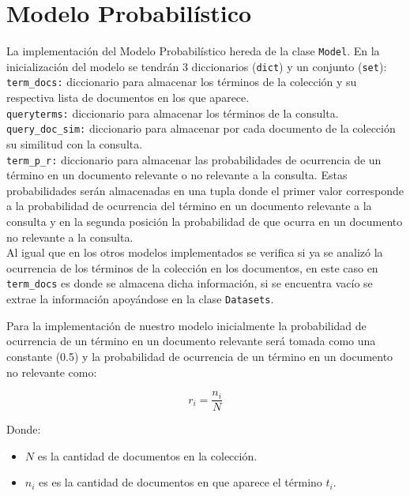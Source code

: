\documentclass[spanish]{article}
\begin{document}
		\section*{Modelo Probabilístico}

			La implementación del Modelo Probabilístico hereda de la clase \texttt{Model}. En la inicialización del modelo se tendrán 3 diccionarios (\texttt{dict}) y un conjunto (\texttt{set}): \\

			\texttt{term\_docs:} diccionario para almacenar los términos de la colección y su respectiva lista de documentos en los que aparece.\\

			\texttt{queryterms:} diccionario para almacenar los términos de la consulta.\\

			\texttt{query\_doc\_sim:} diccionario para almacenar por cada documento de la colección su similitud con la consulta.\\

			\texttt{term\_p\_r:} diccionario para almacenar las probabilidades de ocurrencia de un término en un documento relevante o no relevante a la consulta. Estas probabilidades serán almacenadas en una tupla donde el primer valor corresponde a la probabilidad de ocurrencia del término en un documento relevante a la consulta y en la segunda posición la probabilidad de que ocurra en un documento no relevante a la consulta.\\

			Al igual que en los otros modelos implementados se verifica si ya se analizó la ocurrencia de los términos de la colección en los documentos, en este caso en \texttt{term\_docs} es donde se almacena dicha información, si se encuentra vacío se extrae la información apoyándose en la clase \texttt{Datasets}.

			Para la implementación de nuestro modelo inicialmente la probabilidad de ocurrencia de un término en un documento relevante será tomada como una constante (0.5) y la probabilidad de ocurrencia de un término en un documento no relevante como:

			\begin{equation}\label{key}
				\displaystyle r_i = \frac{n_i}{N}
			\end{equation}

			Donde: 
			\begin{itemize}
				\item $ N $ es la cantidad de documentos en la colección.

				\item $ n_i $ es es la cantidad de documentos en que aparece el término $ t_i $.
			\end{itemize}
\end{document}
